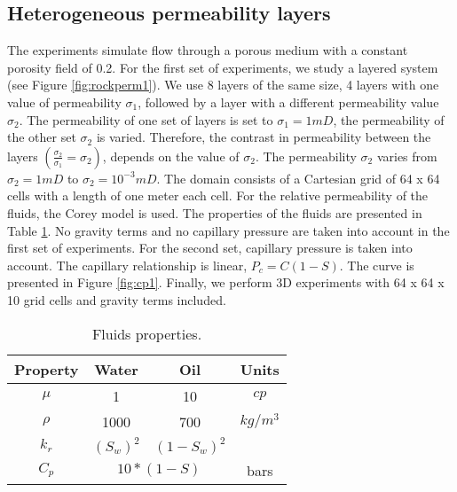 \documentclass[12pt]{article}
\begin{document}
\subsection*{Heterogeneous permeability layers}
The experiments simulate flow through a porous medium with a constant porosity field of 0.2.
For the first set of experiments, we study a layered system (see Figure \ref{fig:rockperm1}). We use 8 layers of the same size, 
4 layers with one value of permeability $\sigma_1$, followed by a layer with a different permeability value $\sigma_2$. The permeability of one set of layers is set to $\sigma_1=1mD$, the permeability of the other set $\sigma_2$ is varied. 
Therefore, the contrast in permeability between the layers $(\frac{\sigma_2}{\sigma_1}=\sigma_2)$,
depends on the value of $\sigma_2$.
The permeability $\sigma_2$ varies from $\sigma_2=1mD$ to $\sigma_2=10^{-3}mD$. 
The domain consists of a Cartesian grid of 64 x 64 cells with a length of one meter each cell. For the relative permeability of the fluids, the Corey model is used. The properties of the fluids are presented in Table \ref{table:fluids}. No gravity terms and no capillary pressure are taken into account in the first set of experiments.
For the second set, capillary pressure is taken into account. The capillary relationship is linear, $P_c = C(1-S)$. The curve is presented in Figure \ref{fig:cp1}. 
Finally, we perform 3D experiments with 64 x 64 x 10 grid cells and gravity terms included. 
\begin{table}[!ht]
\hspace{1cm}
\begin{minipage}{.9\textwidth}%
\centering
\begin{tabular}{ |c|c|c|c|} 
\hline
Property&Water&Oil&Units\\
\hline
$\mu$&     1&    10 & $cp$  \\  
$\rho$& 1000& 700& $kg/m^3$\\
$k_r$&$(S_w)^2$&   $(1-S_w)^2$ &  \\
\hline
 $C_p$&\multicolumn{2}{|c|}{$10*(1-S)$}&bars\\
\hline
\end{tabular}
\caption{Fluids properties.}\label{table:fluids}
\end{minipage} \hspace{1cm} 
\end{table} 
\end{document}
